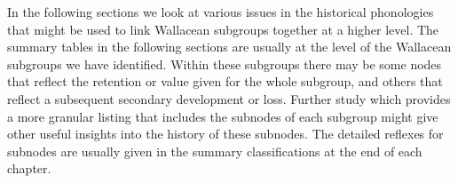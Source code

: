 In the following sections we look at various issues in the historical
phonologies that might be used to link Wallacean subgroups together
at a higher level.
The summary tables in the following sections are usually at the
level of the Wallacean subgroups we have identified.
Within these subgroups there may be some nodes that reflect the
retention or value given for the whole subgroup,
and others that reflect a subsequent secondary development or loss.
Further study which provides a more granular listing that includes
the subnodes of each subgroup might give other useful insights
into the history of these subnodes.
The detailed reflexes for subnodes are usually given in the summary
classifications at the end of each chapter.
